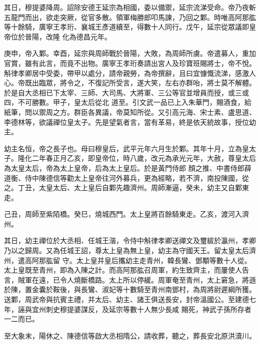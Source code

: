 \begin{pinyinscope}
 其日，穆提婆降周。詔除安德王延宗為相國，委以備禦，延宗流涕受命。帝乃夜斬五龍門而出，欲走突厥，從官多散。領軍梅勝郎叩馬諫，乃回之鄴。時唯高阿那肱等十餘騎，廣寧王孝珩、襄城王彥道續至，得數十人同行。戊午，延宗從眾議即皇帝位於晉陽，改隆
 化為德昌元年。



 庚申，帝入鄴。幸酉，延宗與周師戰於晉陽，大敗，為周師所虜。帝遣募人，重加官賞，雖有此言，而竟不出物。廣寧王孝珩奏請出宮人及珍寶班賜將士，帝不悅。斛律孝卿居中受委，帶甲以處分，請帝親勞，為帝撰辭，且曰宜慷慨流涕，感激人心。帝既出臨眾，將令之，不復記所受言，遂大笑，左右亦群咍，將士莫不解體。於是自大丞相已下太宰、三師、大司馬、大將軍、三公等官並增員而授，或三或四，不可勝數。甲子，皇太后從北
 道至。引文武一品已上入朱華門，賜酒食，給紙筆，問以禦周之方。群臣各異議，帝莫知所從。又引高元海、宋士素、盧思道、李德林等，欲議禪位皇太子。先是望氣者言，當有革易，終是依天統故事，授位幼主。



 幼主名恒，帝之長子也。母曰穆皇后，武平元年六月生於鄴。其年十月，立為皇太子。隆化二年春正月乙亥，即皇帝位，時八歲，改元為承光元年，大赦，尊皇太后為太皇太后，帝為太上皇帝，后為太上皇后。於是黃門侍郎
 顏之推、中書侍郎薛道衡、侍中陳德信等勸太上皇帝往河外募兵，更為經略，若不濟，南投陳國，從之。丁丑，太皇太后、太上皇后自鄴先趣濟州。周師漸逼，癸未，幼主又自鄴東走。



 己丑，周師至紫陌橋。癸巳，燒城西門。太上皇將百餘騎東走。乙亥，渡河入濟州。



 其日，幼主禪位於大丞相、任城王湝，令侍中斛律孝卿送禪文及璽紱於瀛州，孝卿乃以之歸周。又為任城王詔，尊太上皇為無上皇，幼主為守國天王。留太皇太后濟州，遣高阿那肱留
 守。太上皇并皇后攜幼主走青州，韓長鸞、鄧顒等數十人從。太上皇既至青州，即為入陳之計。而高阿那肱召周軍，約生致齊主，而屢使人告言，賊軍在遠，已令人燒斷橋路。太上所以停緩。周軍奄至青州，太上窘急，將遜於陳，置金囊於鞍後，與長鸞、淑妃等十數騎至青州南鄧村，為周將尉遲綱所獲。送鄴，周武帝與抗賓主禮，并太后、幼主、諸王俱送長安，封帝溫國公。至建德七年，誣與宜州刺史穆提婆謀反，及延宗等數十人無少長咸
 賜死，神武子孫所存者一二而已。



 至大象末，陽休之、陳德信等啟大丞相隋公，請收葬，聽之，葬長安北原洪瀆川。




\end{pinyinscope}
